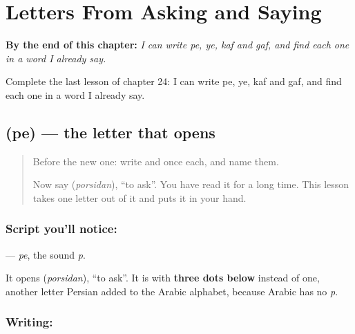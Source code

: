
\chapter{Letters From Asking and Saying}
\label{ch:fa-letters-asking-saying}

\begin{chapteropening}
\textbf{By the end of this chapter:} \emph{I can write pe, ye, kaf and gaf, and find each one in a word I already say.}

Complete the last lesson of chapter 24: I can write pe, ye, kaf and gaf, and find each one in a word I already say.
\end{chapteropening}

\section[\texorpdfstring{\fa{پ} (pe)}{پ (pe)}]{ (pe) — the letter that opens }

\label{lesson:FA-W24-pe}



\begin{quote}
Before the new one: write  and  once each, and name them.

Now say \textbf{} (\emph{porsidan}), \textquotedblleft{}to ask\textquotedblright{}. You have read it for a long time. This lesson takes one letter out of it and puts it in your hand.
\end{quote}

\subsection*{Script you'll notice: }
\textbf{} — \emph{pe}, the sound \emph{p}.

It opens \textbf{} (\emph{porsidan}), \textquotedblleft{}to ask\textquotedblright{}. It is \textbf{} with \textbf{three dots below} instead of one, another letter Persian added to the Arabic alphabet, because Arabic has no \emph{p}.

\subsection*{Writing: }

